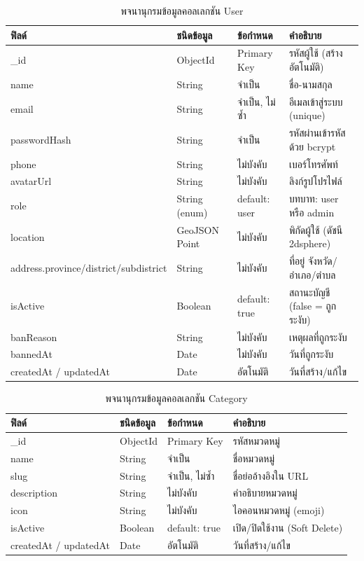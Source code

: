 \documentclass[12pt,a4paper]{report}
\begin{document}
\begin{table}[htbp]
\centering
\caption{พจนานุกรมข้อมูลคอลเลกชัน User}
\label{tab:dd-user}
\begin{tabularx}{\textwidth}{>{\raggedright\arraybackslash}p{3.3cm} >{\raggedright\arraybackslash}p{2.5cm} >{\raggedright\arraybackslash}p{2.3cm} X}
\toprule
\textbf{ฟิลด์} & \textbf{ชนิดข้อมูล} & \textbf{ข้อกำหนด} & \textbf{คำอธิบาย}\\
\midrule
\_id & ObjectId & Primary Key & รหัสผู้ใช้ (สร้างอัตโนมัติ)\\
name & String & จำเป็น & ชื่อ-นามสกุล\\
email & String & จำเป็น, ไม่ซ้ำ & อีเมลเข้าสู่ระบบ (unique)\\
passwordHash & String & จำเป็น & รหัสผ่านเข้ารหัสด้วย bcrypt\\
phone & String & ไม่บังคับ & เบอร์โทรศัพท์\\
avatarUrl & String & ไม่บังคับ & ลิงก์รูปโปรไฟล์\\
role & String (enum) & default: user & บทบาท: user หรือ admin\\
location & GeoJSON Point & ไม่บังคับ & พิกัดผู้ใช้ (ดัชนี 2dsphere)\\
address.\allowbreak province/\allowbreak district/\allowbreak subdistrict & String & ไม่บังคับ & ที่อยู่ จังหวัด/อำเภอ/ตำบล\\
isActive & Boolean & default: true & สถานะบัญชี (false = ถูกระงับ)\\
banReason & String & ไม่บังคับ & เหตุผลที่ถูกระงับ\\
bannedAt & Date & ไม่บังคับ & วันที่ถูกระงับ\\
createdAt / updatedAt & Date & อัตโนมัติ & วันที่สร้าง/แก้ไข\\
\bottomrule
\end{tabularx}
\end{table}

\begin{table}[htbp]
\centering
\caption{พจนานุกรมข้อมูลคอลเลกชัน Category}
\label{tab:dd-category}
\begin{tabularx}{\textwidth}{>{\raggedright\arraybackslash}p{3.3cm} >{\raggedright\arraybackslash}p{2.5cm} >{\raggedright\arraybackslash}p{2.3cm} X}
\toprule
\textbf{ฟิลด์} & \textbf{ชนิดข้อมูล} & \textbf{ข้อกำหนด} & \textbf{คำอธิบาย}\\
\midrule
\_id & ObjectId & Primary Key & รหัสหมวดหมู่\\
name & String & จำเป็น & ชื่อหมวดหมู่\\
slug & String & จำเป็น, ไม่ซ้ำ & ชื่อย่ออ้างอิงใน URL\\
description & String & ไม่บังคับ & คำอธิบายหมวดหมู่\\
icon & String & ไม่บังคับ & ไอคอนหมวดหมู่ (emoji)\\
isActive & Boolean & default: true & เปิด/ปิดใช้งาน (Soft Delete)\\
createdAt / updatedAt & Date & อัตโนมัติ & วันที่สร้าง/แก้ไข\\
\bottomrule
\end{tabularx}
\end{table}
\end{document}
